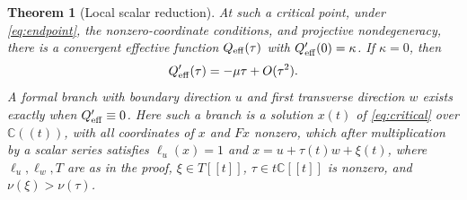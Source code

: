 \documentclass[11pt]{article}
\newtheorem{theorem}{Theorem}[section]
\theoremstyle{remark}\newtheorem{remark}[theorem]{Remark}
\newcommand{\C}{\mathbb C}\newcommand{\Q}{\mathbb Q}
\begin{document}
\begin{theorem}[Local scalar reduction]\label{thm:local}
At such a critical point, under \eqref{eq:endpoint}, the nonzero-coordinate
conditions, and projective nondegeneracy, there is a convergent effective function
$Q_{\rm eff}(\tau)$ with $Q_{\rm eff}'(0)=\kappa$. If $\kappa=0$, then
\[
 Q_{\rm eff}'(\tau)=-\mu\tau+O(\tau^2).
\]
A formal branch with boundary direction $u$ and first transverse direction
$w$ exists exactly when $Q_{\rm eff}'\equiv0$. Here such a branch is a
solution $x(t)$ of \eqref{eq:critical} over $\C((t))$, with all
coordinates of $x$ and $Fx$ nonzero, which after multiplication by a
scalar series satisfies $\ell_u(x)=1$ and $x=u+\tau(t)w+\xi(t)$, where
$\ell_u,\ell_w,T$ are as in the proof, $\xi\in T[[t]]$, $\tau\in t\C[[t]]$
is nonzero, and $\nu(\xi)>\nu(\tau)$.
\end{theorem}
\end{document}
